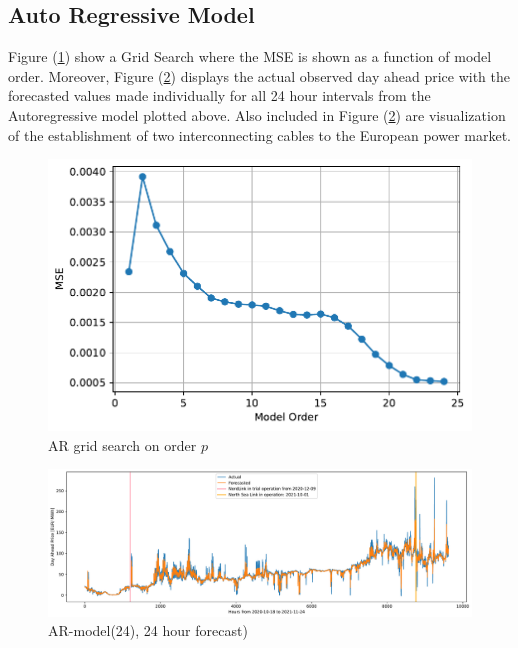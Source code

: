 \documentclass
[twocolumn,
secnumarabic,
nobibnotes,
aps,
prl,
reprint,
groupedaddress,
amsmath,
amssymb,
]{revtex4-2}
\begin{document}
\subsection{Auto Regressive Model}
Figure (\ref{fig:AR_gridsearch}) show a Grid Search where the MSE is shown as a function of model order. 
Moreover, Figure (\ref{fig:AR(24)_daily predictions}) displays the actual observed day ahead price with the forecasted values made individually for all 24 hour intervals from the Autoregressive model plotted above. Also included in Figure (\ref{fig:AR(24)_daily predictions}) are visualization of the establishment of two interconnecting cables to the European power market.

\begin{figure}
  \includegraphics[width=\columnwidth]{figures/AR_gridsearch.pdf} 
  \caption{\label{fig:AR_gridsearch} AR grid search on order $p$}
\end{figure}

\begin{figure}
  \includegraphics[width= 2.1\columnwidth]{figures/AR(24)_daily predictions.pdf} 
  \caption{\label{fig:AR(24)_daily predictions} AR-model(24), 24 hour forecast)}
\end{figure}
\end{document}
